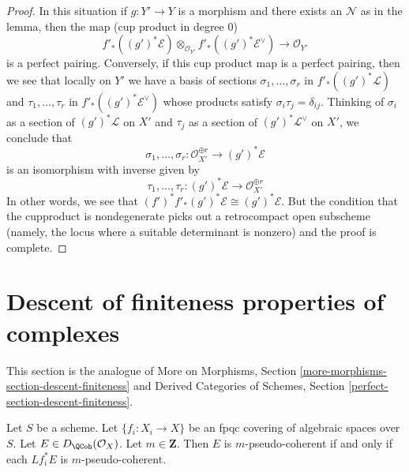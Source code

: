\begin{proof}
\medskip\noindent
In this situation if $g : Y' \to Y$ is a morphism and there exists an
$\mathcal{N}$ as in the lemma, then the map (cup product in degree $0$)
$$
f'_*((g')^*\mathcal{E})
\otimes_{\mathcal{O}_{Y'}}
f'_*((g')^*\mathcal{E}^\vee)
\longrightarrow \mathcal{O}_{Y'}
$$
is a perfect pairing. Conversely, if this cup product map is a
perfect pairing, then we see that locally on $Y'$ we have
a basis of sections
$\sigma_1, \ldots, \sigma_r$ in $f'_*((g')^*\mathcal{L})$ and
$\tau_1, \ldots, \tau_r$ in
$f'_*((g')^*\mathcal{E}^\vee)$ whose products satisfy
$\sigma_i \tau_j = \delta_{ij}$. Thinking of $\sigma_i$
as a section of $(g')^*\mathcal{L}$ on $X'$
and $\tau_j$ as a section of $(g')^*\mathcal{L}^\vee$ on $X'$,
we conclude that
$$
\sigma_1, \ldots, \sigma_r :
\mathcal{O}_{X'}^{\oplus r}
\longrightarrow
(g')^*\mathcal{E}
$$
is an isomorphism with inverse given by
$$
\tau_1, \ldots, \tau_r :
(g')^*\mathcal{E}
\longrightarrow
\mathcal{O}_{X'}^{\oplus r}
$$
In other words, we see that
$(f')^*f'_*(g')^*\mathcal{E} \cong (g')^*\mathcal{E}$.
But the condition that the cupproduct is nondegenerate
picks out a retrocompact open subscheme (namely, the locus where a suitable
determinant is nonzero) and the proof is complete.
\end{proof}









\section{Descent of finiteness properties of complexes}
\label{section-descent-finiteness}

\noindent
This section is the analogue of More on Morphisms,
Section \ref{more-morphisms-section-descent-finiteness}
and
Derived Categories of Schemes, Section
\ref{perfect-section-descent-finiteness}.

\begin{lemma}
\label{lemma-pseudo-coherent-descends-fpqc}
Let $S$ be a scheme. Let $\{f_i : X_i \to X\}$ be an fpqc covering of
algebraic spaces over $S$. Let $E \in D_\QCoh(\mathcal{O}_X)$.
Let $m \in \mathbf{Z}$. Then $E$ is $m$-pseudo-coherent if and only if each
$Lf_i^*E$ is $m$-pseudo-coherent.
\end{lemma}

